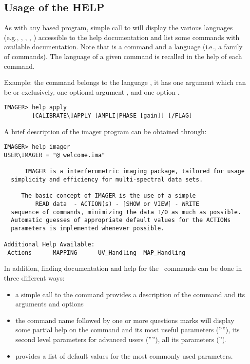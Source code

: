 \subsection{Usage of the HELP}
\label{sub:help}

As with any \sic{} based program, simple call to  will 
display the various languages (e.g., , , 
, ) accessible to the help documentation 
and list some commands with available documentation. Note that 
 is a command and  a language (i.e., a family of 
commands). The language of a given command is recalled in the help of 
each command. 

Example: the command  belongs to the language , 
it has one argument which can be  or  exclusively, 
one optional argument , and one option .
\begin{verbatim} 
IMAGER> help apply
        [CALIBRATE\]APPLY [AMPLI|PHASE [gain]] [/FLAG]
\end{verbatim} 

A brief description of the imager program can be obtained through:
\begin{verbatim} 
IMAGER> help imager
USER\IMAGER = "@ welcome.ima"
 
      IMAGER is a interferometric imaging package, tailored for usage
  simplicity and efficiency for multi-spectral data sets.
 
     The basic concept of IMAGER is the use of a simple
         READ data  - ACTION(s) - [SHOW or VIEW] - WRITE
  sequence of commands, minimizing the data I/O as much as possible.
  Automatic guesses of appropriate default values for the ACTIONs
  parameters is implemented whenever possible.
 
Additional Help Available:
 Actions      MAPPING      UV_Handling  MAP_Handling
\end{verbatim} 

In addition, finding documentation and help for the \imager\ commands 
can be done in three different ways:  
\begin{itemize}
\item a simple call to the  command provides a description of 
the command and its arguments and options
\item the command name followed by one or more questions marks will 
display some partial help on the command and its most useful 
parameters (''''), its second level parameters for advanced 
users (''''), all its parameters (''). 
\item {} provides a list of default values 
for the most commonly used parameters.
\end{itemize}

